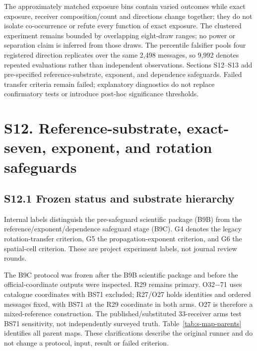 \documentclass[journal,onecolumn,10pt]{IEEEtran}
\begin{document}
The approximately matched exposure bins contain varied outcomes while exact exposure, receiver composition/count and directions change together; they do not isolate co-occurrence or refute every function of exact exposure. The clustered experiment remains bounded by overlapping eight-draw ranges; no power or separation claim is inferred from those draws. The percentile falsifier pools four registered direction replicates over the same 2,498 messages, so 9,992 denotes repeated evaluations rather than independent observations. Sections S12--S13 add pre-specified reference-substrate, exponent, and dependence safeguards. Failed transfer criteria remain failed; explanatory diagnostics do not replace confirmatory tests or introduce post-hoc significance thresholds.


\section*{S12. Reference-substrate, exact-seven, exponent, and rotation safeguards}\label{s12.-reference-substrate-exact-seven-exponent-and-rotation-safeguards}

\subsection*{S12.1 Frozen status and substrate hierarchy}

Internal labels distinguish the pre-safeguard scientific package (B9B) from the reference/exponent/dependence safeguard stage (B9C). G4 denotes the legacy rotation-transfer criterion, G5 the propagation-exponent criterion, and G6 the spatial-cell criterion. These are project experiment labels, not journal review rounds.

The B9C protocol was frozen after the B9B scientific package and before the official-coordinate outputs were inspected. R29 remains primary. O32$-$71 uses catalogue coordinates with BS71 excluded; R27/O27 holds identities and ordered messages fixed, with BS71 at the R29 coordinate in both arms. O27 is therefore a mixed-reference construction. The published/substituted 33-receiver arms test BS71 sensitivity, not independently surveyed truth. Table~\ref{tab:s-map-parents} identifies all parent maps. These clarifications describe the original runner and do not change a protocol, input, result or failed criterion.
\end{document}
